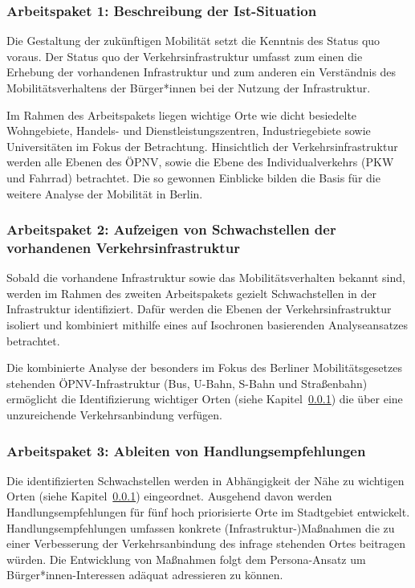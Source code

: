 \subsubsection{Arbeitspaket 1: Beschreibung der Ist-Situation}
\label{arbeitspaket_1_beschreibung_der_ist-situation}

Die Gestaltung der zukünftigen Mobilität setzt die Kenntnis des Status quo voraus. Der Status quo der Verkehrsinfrastruktur umfasst zum einen die Erhebung der vorhandenen Infrastruktur und zum anderen ein Verständnis des Mobilitätsverhaltens der Bürger*innen bei der Nutzung der Infrastruktur.

Im Rahmen des Arbeitspakets liegen wichtige Orte wie dicht besiedelte Wohngebiete, Handels- und Dienstleistungszentren, Industriegebiete sowie Universitäten im Fokus der Betrachtung. Hinsichtlich der Verkehrsinfrastruktur werden alle Ebenen des \ac{ÖPNV}, sowie die Ebene des Individualverkehrs (PKW und Fahrrad) betrachtet. Die so gewonnen Einblicke bilden die Basis für die weitere Analyse der Mobilität in Berlin.

\subsubsection{Arbeitspaket 2: Aufzeigen von Schwachstellen der vorhandenen Verkehrsinfrastruktur}

Sobald die vorhandene Infrastruktur sowie das Mobilitätsverhalten bekannt sind, werden im Rahmen des zweiten Arbeitspakets gezielt Schwachstellen in der Infrastruktur identifiziert. Dafür werden die Ebenen der Verkehrsinfrastruktur isoliert und kombiniert mithilfe eines auf Isochronen basierenden Analyseansatzes betrachtet.

Die kombinierte Analyse der besonders im Fokus des Berliner Mobilitätsgesetzes stehenden ÖPNV-Infrastruktur (Bus, U-Bahn, S-Bahn und Straßenbahn) ermöglicht die Identifizierung wichtiger Orten (siehe Kapitel~\ref{arbeitspaket_1_beschreibung_der_ist-situation}) die über eine unzureichende Verkehrsanbindung verfügen.

\subsubsection{Arbeitspaket 3: Ableiten von Handlungsempfehlungen}
\label{arbeitspaket_3_ableiten_von_handlungsempfehlungen}

Die identifizierten Schwachstellen werden in Abhängigkeit der Nähe zu wichtigen Orten (siehe Kapitel~\ref{arbeitspaket_1_beschreibung_der_ist-situation}) eingeordnet. Ausgehend davon werden Handlungsempfehlungen für fünf hoch priorisierte Orte im Stadtgebiet entwickelt. Handlungsempfehlungen umfassen konkrete (Infrastruktur-)Maßnahmen die zu einer Verbesserung der Verkehrsanbindung des infrage stehenden Ortes beitragen würden. Die Entwicklung von Maßnahmen folgt dem Persona-Ansatz um Bürger*innen-Interessen adäquat adressieren zu können.

